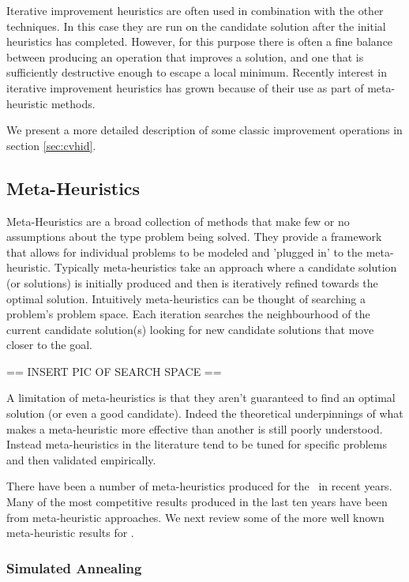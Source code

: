 Iterative improvement heuristics are often used in combination with the other techniques. In this case they are run on the candidate solution after the initial heuristics has completed. However, for this purpose there is often a fine balance between producing an operation that improves a solution, and one that is sufficiently destructive enough to escape a local minimum.  Recently interest in iterative improvement heuristics has grown because of their use as part of meta-heuristic methods. 

We present a more detailed description of some classic improvement operations in section \ref{sec:cvhid}.

\subsection{Meta-Heuristics}

Meta-Heuristics are a broad collection of methods that make few or no assumptions about the type problem being solved. They provide a framework that allows for individual problems to be modeled and 'plugged in' to the meta-heuristic. Typically meta-heuristics take an approach where a candidate solution (or solutions) is initially produced and then is iteratively refined towards the optimal solution. Intuitively meta-heuristics can be thought of searching a problem's problem space. Each iteration searches the neighbourhood of the current candidate solution(s) looking for new candidate solutions that move closer to the goal. 

== INSERT PIC OF SEARCH SPACE ==

A limitation of meta-heuristics is that they aren't guaranteed to find an optimal solution (or even a good candidate). Indeed the theoretical underpinnings of what makes a meta-heuristic more effective than another is still poorly understood. Instead meta-heuristics in the literature tend to be tuned for specific problems and then validated empirically.

There have been a number of meta-heuristics produced for the \VRP\ in recent years. Many of the most competitive results produced in the last ten years have been from meta-heuristic approaches. We next review some of the more well known meta-heuristic results for \VRP.

\subsubsection{Simulated Annealing}

